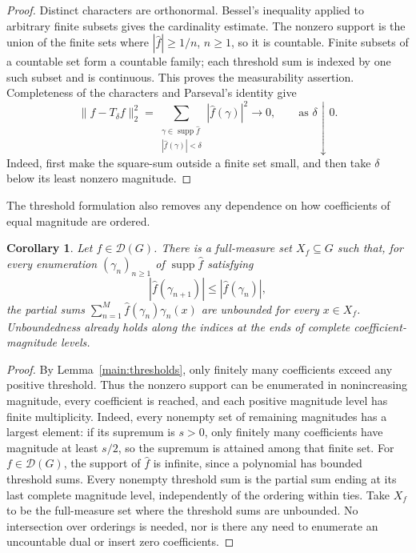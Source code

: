 \documentclass[11pt]{amsart}
\newtheorem{corollary}[theorem]{Corollary}
\theoremstyle{definition}
\theoremstyle{remark}
\newcommand{\supp}{\operatorname{supp}}
\newcommand{\D}{\mathcal D}
\begin{document}
\begin{proof}
Distinct characters are orthonormal. Bessel's inequality applied
to arbitrary finite subsets gives the cardinality estimate.
The nonzero support is the union of the finite sets where
\(|\widehat f|\geq1/n\), \(n\geq1\), so it is countable.
Finite subsets of a countable set form a countable family;
each threshold sum is indexed by one such subset and is continuous.
This proves the measurability assertion. Completeness of the
characters and Parseval's identity give
\[
 \|f-T_\delta f\|_2^2
 =\sum_{\substack{\gamma\in\supp\widehat f\\
                         |\widehat f(\gamma)|<\delta}}
                  |\widehat f(\gamma)|^2\longrightarrow0,\qquad \text{as }\delta\downarrow0.
\]
Indeed, first make the square-sum outside a finite set small,
and then take \(\delta\) below its least nonzero magnitude.
\end{proof}

The threshold formulation also removes any dependence on how coefficients of
equal magnitude are ordered.

\begin{corollary}\label{main:ties}
Let \(f\in\D(G)\). There is a full-measure set \(X_f\subseteq G\)
such that, for every enumeration \((\gamma_n)_{n\geq1}\) of
\(\supp\widehat f\) satisfying
\[
 |\widehat f(\gamma_{n+1})|\leq|\widehat f(\gamma_n)|,
\]
the partial sums \(\sum_{n=1}^M\widehat f(\gamma_n)\gamma_n(x)\)
are unbounded for every \(x\in X_f\). Unboundedness already holds
along the indices at the ends of complete coefficient-magnitude levels.
\end{corollary}

\begin{proof}
By Lemma~\ref{main:thresholds}, only finitely many coefficients
exceed any positive threshold. Thus the nonzero support can be
enumerated in nonincreasing magnitude, every coefficient is reached,
and each positive magnitude level has finite multiplicity.
Indeed, every nonempty set of remaining magnitudes has a largest
element: if its supremum is \(s>0\), only finitely many coefficients
have magnitude at least \(s/2\), so the supremum is attained among
that finite set.
For \(f\in\D(G)\), the support of \(\widehat f\) is infinite, since a polynomial
has bounded threshold sums. Every nonempty threshold sum is the
partial sum ending at its last complete magnitude level, independently
of the ordering within ties. Take \(X_f\) to be the full-measure set
where the threshold sums are unbounded. No intersection over orderings
is needed, nor is there any need to enumerate an uncountable dual or
insert zero coefficients.
\end{proof}
\end{document}
